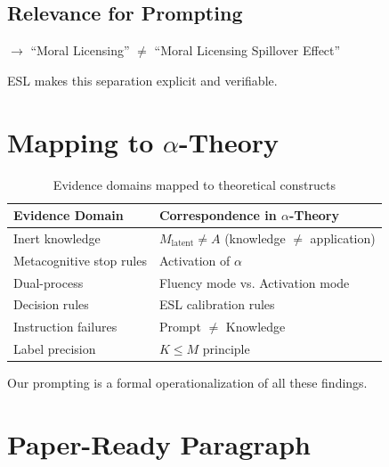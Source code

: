 \documentclass[11pt,a4paper]{article}
\begin{document}
\subsection{Relevance for Prompting}

$\rightarrow$ ``Moral Licensing'' $\neq$ ``Moral Licensing Spillover Effect''

\begin{keypoint}
ESL makes this separation explicit and verifiable.
\end{keypoint}


\section{Mapping to $\alpha$-Theory}

\begin{table}[h]
\centering
\caption{Evidence domains mapped to theoretical constructs}
\begin{tabular}{ll}
\toprule
\textbf{Evidence Domain} & \textbf{Correspondence in $\alpha$-Theory} \\
\midrule
Inert knowledge & $M_{\text{latent}} \neq A$ (knowledge $\neq$ application) \\
Metacognitive stop rules & Activation of $\alpha$ \\
Dual-process & Fluency mode vs. Activation mode \\
Decision rules & ESL calibration rules \\
Instruction failures & Prompt $\neq$ Knowledge \\
Label precision & $K \leq M$ principle \\
\bottomrule
\end{tabular}
\end{table}

\begin{keypoint}
Our prompting is a formal operationalization of all these findings.
\end{keypoint}


\section{Paper-Ready Paragraph}
\end{document}
